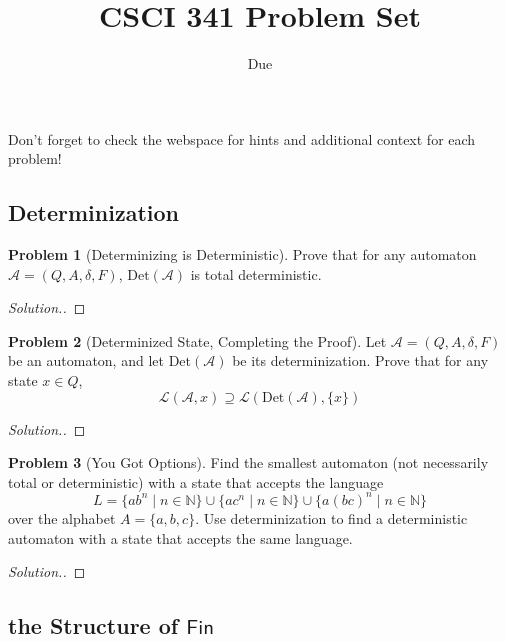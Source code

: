 \documentclass[11pt]{article}
\title{CSCI 341 Problem Set \pset}
\author{\subtitle}
\date{Due
    \duedate
}
\theoremstyle{theorem} %
\theoremstyle{definition} %
\newtheorem{problem}                    {{\color{BurntOrange}Problem}}
\theoremstyle{remark} %
\begin{document}
\maketitle

Don't forget to check the webspace for hints and additional context for each problem!

\subsection*{Determinization}

\begin{problem}
    [Determinizing is Deterministic]
    Prove that for any automaton \(\mathcal A = (Q, A, \delta, F)\), \(\mathrm{Det}(\mathcal A)\) is total deterministic.    
\end{problem}

\begin{proof}[Solution.]
    
\end{proof}

\begin{problem}
    [Determinized State, Completing the Proof]
    Let \(\mathcal A = (Q, A, \delta, F)\) be an automaton, and let \(\mathrm{Det}(\mathcal A)\) be its determinization.
    Prove that for any state \(x \in Q\), 
    \[
        \mathcal L(\mathcal A, x) \supseteq \mathcal L(\mathrm{Det}(\mathcal A), \{x\})
    \]    
\end{problem}

\begin{proof}[Solution.]
    
\end{proof}

\begin{problem}
    [You Got Options]
    Find the smallest automaton (not necessarily total or deterministic) with a state that accepts the language 
    \[
        L = \{ab^n \mid n \in \mathbb N\} \cup \{ac^n \mid n \in \mathbb N\} \cup \{a(bc)^n \mid n \in \mathbb N\}
    \]
    over the alphabet \(A = \{a,b,c\}\).
    Use determinization to find a deterministic automaton with a state that accepts the same language.  
\end{problem}

\begin{proof}[Solution.]
    
\end{proof}

\subsection*{the Structure of \(\mathsf{Fin}\)}
\end{document}
